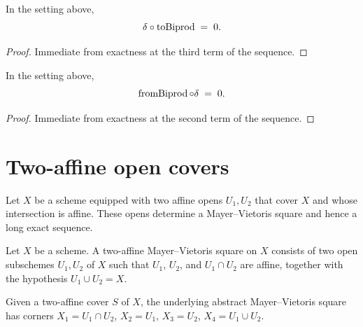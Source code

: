 \begin{lemma}\leanok
  \label{lem:Scheme_HModule_prime_delta_toBiprod}

  In the setting above,
  \[
    \delta \circ \operatorname{toBiprod} \;=\; 0.
  \]
\end{lemma}

\begin{proof}
  
  \leanok
  Immediate from exactness at the third term of the sequence.
\end{proof}

\begin{lemma}\leanok
  \label{lem:Scheme_HModule_prime_fromBiprod_delta}

  In the setting above,
  \[
    \operatorname{fromBiprod} \circ \delta \;=\; 0.
  \]
\end{lemma}

\begin{proof}
  
  \leanok
  Immediate from exactness at the second term of the sequence.
\end{proof}

\section{Two-affine open covers}
\label{sec:scheme_affineCoverMVSquare}

Let \(X\) be a scheme equipped with two affine opens \(U_1,U_2\) that cover \(X\) and whose intersection is affine. These opens determine a Mayer--Vietoris square and hence a long exact sequence.

\begin{definition}\leanok
  \label{def:Scheme_AffineCoverMVSquare}
  
  Let \(X\) be a scheme. A two-affine Mayer--Vietoris square on \(X\) consists of two open subschemes \(U_1, U_2\) of \(X\) such that \(U_1\), \(U_2\), and \(U_1 \cap U_2\) are affine, together with the hypothesis \(U_1 \cup U_2 = X\).
\end{definition}

\begin{definition}\leanok
  \label{def:Scheme_AffineCoverMVSquare_toMayerVietorisSquare}

  Given a two-affine cover \(S\) of \(X\), the underlying abstract Mayer--Vietoris square has corners \(X_1 = U_1 \cap U_2\), \(X_2 = U_1\), \(X_3 = U_2\), \(X_4 = U_1 \cup U_2\).
\end{definition}

